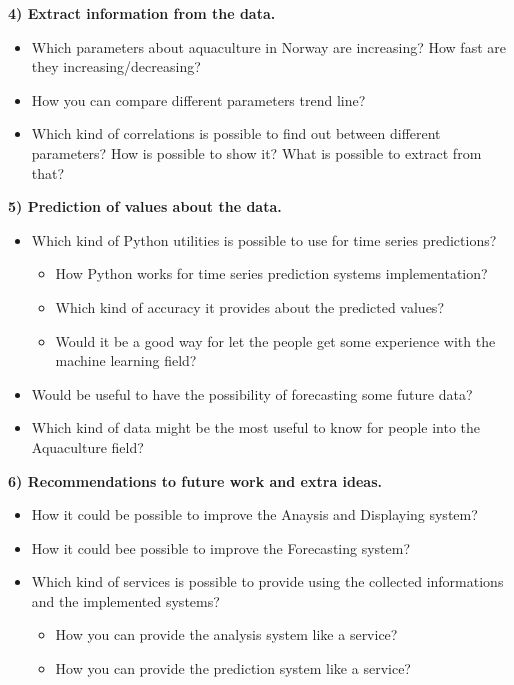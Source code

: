 \newpage

\textbf{4) Extract information from the data.}
\vspace{-5mm}
\begin{itemize}
 \setlength{\itemsep}{-5pt}
  \item Which parameters about aquaculture in Norway are increasing? How fast are they increasing/decreasing? 
  \item How you can compare different parameters trend line?
  \item Which kind of correlations is possible to find out between different parameters? How is possible to show it? What is possible to extract from that?
 \end{itemize}
 
\textbf{5) Prediction of values about the data.}
\vspace{-5mm}
\begin{itemize}
 \setlength{\itemsep}{-5pt} 
  \item Which kind of Python utilities is possible to use for time series predictions?
  		\vspace{-3mm}
		\begin{itemize}
 		\setlength{\itemsep}{-5pt}	
		  \item How Python works for time series prediction systems implementation?
		  \item Which kind of accuracy it provides about the predicted values?
		  \item Would it be a good way for let the people get some experience with the machine learning field? 
		\end{itemize}
  \item Would be useful to have the possibility of forecasting some future data? 
  \item Which kind of data might be the most useful to know for people into the Aquaculture field?
	
 \end{itemize}

\textbf{6) Recommendations to future work and extra ideas.}
\vspace{-5mm}
\begin{itemize}
\setlength{\itemsep}{-5pt}
	\item How it could be possible to improve the Anaysis and Displaying system?
	\item How it could bee possible to improve the Forecasting system?
	\item Which kind of services is possible to provide using the collected informations and the implemented systems?
  		\vspace{-3mm}
		\begin{itemize}
 		\setlength{\itemsep}{-5pt}	
		  	\item How you can provide the analysis system like a service?
		  	\item How you can provide the prediction system like a service?
		\end{itemize}
 \end{itemize}

